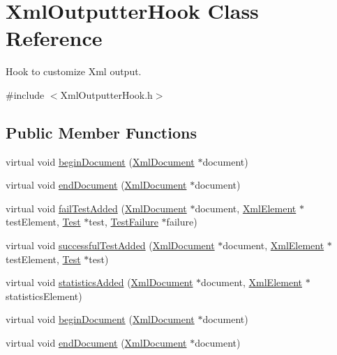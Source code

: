 \hypertarget{class_xml_outputter_hook}{\section{Xml\+Outputter\+Hook Class Reference}
\label{class_xml_outputter_hook}
}


Hook to customize Xml output.  




{\ttfamily \#include $<$Xml\+Outputter\+Hook.\+h$>$}

\subsection*{Public Member Functions}
\begin{DoxyCompactItemize}
\item 
virtual void \hyperlink{class_xml_outputter_hook_a35d3cc333991efbf9a6365fefc93ed46}{begin\+Document} (\hyperlink{class_xml_document}{Xml\+Document} $\ast$document)
\item 
virtual void \hyperlink{class_xml_outputter_hook_afa02a81666ef87974cabc94981724000}{end\+Document} (\hyperlink{class_xml_document}{Xml\+Document} $\ast$document)
\item 
virtual void \hyperlink{class_xml_outputter_hook_aba4c8b38c5a96e5bf4e3a60303169581}{fail\+Test\+Added} (\hyperlink{class_xml_document}{Xml\+Document} $\ast$document, \hyperlink{class_xml_element}{Xml\+Element} $\ast$test\+Element, \hyperlink{class_test}{Test} $\ast$test, \hyperlink{class_test_failure}{Test\+Failure} $\ast$failure)
\item 
virtual void \hyperlink{class_xml_outputter_hook_aa50aa698854c504b7f86b4a14bfabe4d}{successful\+Test\+Added} (\hyperlink{class_xml_document}{Xml\+Document} $\ast$document, \hyperlink{class_xml_element}{Xml\+Element} $\ast$test\+Element, \hyperlink{class_test}{Test} $\ast$test)
\item 
virtual void \hyperlink{class_xml_outputter_hook_a62de92c797907f3ae927a41a587539d9}{statistics\+Added} (\hyperlink{class_xml_document}{Xml\+Document} $\ast$document, \hyperlink{class_xml_element}{Xml\+Element} $\ast$statistics\+Element)
\item 
virtual void \hyperlink{class_xml_outputter_hook_a1d2b5d5d0fc42d273d6430522a70ccbb}{begin\+Document} (\hyperlink{class_xml_document}{Xml\+Document} $\ast$document)
\item 
virtual void \hyperlink{class_xml_outputter_hook_a300e2a4ef46db4e76428e32f7c7e6a23}{end\+Document} (\hyperlink{class_xml_document}{Xml\+Document} $\ast$document)

\end{DoxyCompactItemize}

